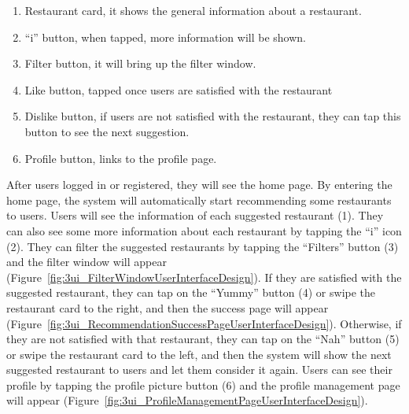 \documentclass[12pt,oneside,openright,a4paper]{cpe-english-project}
\begin{document}
\begin{enumerate}
\item Restaurant card, it shows the general information about a restaurant.
\item “i” button, when tapped, more information will be shown.
\item Filter button, it will bring up the filter window.
\item Like button, tapped once users are satisfied with the restaurant
\item Dislike button, if users are not satisfied with the restaurant, they can tap this button to see the next suggestion.
\item Profile button, links to the profile page.
\end{enumerate}

After users logged in or registered, they will see the home page. By entering the home page, the system will automatically start recommending some restaurants to users. Users will see the information of each suggested restaurant (1). They can also see some more information about each restaurant by tapping the “i” icon (2). They can filter the suggested restaurants by tapping the “Filters” button (3) and the filter window will appear (Figure~\ref{fig:3ui_FilterWindowUserInterfaceDesign}). If they are satisfied with the suggested restaurant, they can tap on the “Yummy” button (4) or swipe the restaurant card to the right, and then the success page will appear (Figure~\ref{fig:3ui_RecommendationSuccessPageUserInterfaceDesign}). Otherwise, if they are not satisfied with that restaurant, they can tap on the “Nah” button (5) or swipe the restaurant card to the left, and then the system will show the next suggested restaurant to users and let them consider it again. Users can see their profile by tapping the profile picture button (6) and the profile management page will appear (Figure~\ref{fig:3ui_ProfileManagementPageUserInterfaceDesign}).
\end{document}
